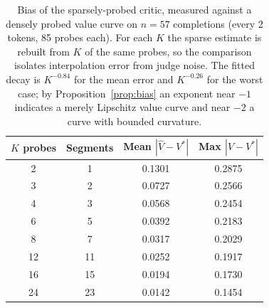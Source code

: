 \begin{table}[t]\centering\small
\caption{Bias of the sparsely-probed critic, measured against a densely
probed value curve on $n=57$ completions
(every 2 tokens, 85 probes each).
For each $K$ the sparse estimate is rebuilt from $K$ of the same probes, so the
comparison isolates interpolation error from judge noise. The fitted decay is
$K^{-0.84}$ for the mean error and
$K^{-0.26}$ for the worst case; by
Proposition~\ref{prop:bias} an exponent near $-1$ indicates a merely
Lipschitz value curve and near $-2$ a curve with bounded curvature.}
\label{tab:density}
\begin{tabular}{cccc}
\toprule
$K$ probes & Segments & Mean $|\hat V - V^\ast|$ & Max $|\hat V - V^\ast|$ \\
\midrule
2 & 1 & 0.1301 & 0.2875 \\
3 & 2 & 0.0727 & 0.2566 \\
4 & 3 & 0.0568 & 0.2454 \\
6 & 5 & 0.0392 & 0.2183 \\
8 & 7 & 0.0317 & 0.2029 \\
12 & 11 & 0.0252 & 0.1917 \\
16 & 15 & 0.0194 & 0.1730 \\
24 & 23 & 0.0142 & 0.1454 \\
\bottomrule
\end{tabular}
\end{table}
